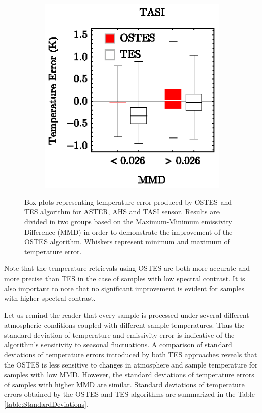 \begin{figure}[!b]
\begin{subfigure}[t]{.3\linewidth}
		\centering
		\includegraphics[scale=1]{pics/Chapter_04/Simulated_data_TASI.eps}
		\hspace{1cm}\caption{}
	\end{subfigure}
	\vspace{1.5 em}
	\caption{Box plots representing temperature error produced by OSTES and TES algorithm for ASTER, AHS and TASI sensor. Results are divided in two groups based on the Maximum-Minimum emissivity Difference (MMD) in order to demonstrate the improvement of the OSTES algorithm. Whiskers represent minimum and maximum of temperature error.}
	\label{fig:SimualtedDataTemperatureErrorVsLowVsHighMMD}
\end{figure}

Note that the temperature retrievals using OSTES are both more accurate and more precise than TES in the case of samples with low spectral contrast. It is also important to note that no significant improvement is evident for samples with higher spectral contrast. 

Let us remind the reader that every sample is processed under several different atmospheric conditions coupled with different sample temperatures. Thus the standard deviation of temperature and emissivity error is indicative of the algorithm's sensitivity to seasonal fluctuations. A comparison of standard deviations of temperature errors introduced by both TES approaches reveals that the OSTES is less sensitive to changes in atmosphere and sample temperature for samples with low MMD. However, the standard deviations of temperature errors of samples with higher MMD are similar. Standard deviations of temperature errors obtained by the OSTES and TES algorithms are summarized in the Table \ref{table:StandardDeviations}.

